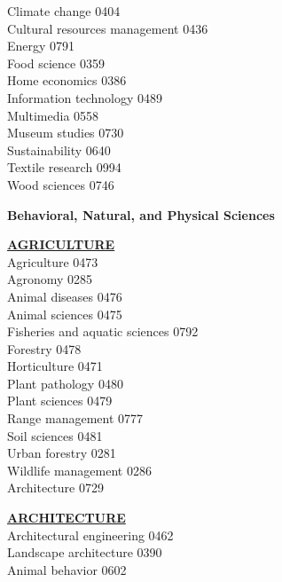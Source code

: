\documentclass[9pt,twoside]{article}
\newcommand{\categoryheading}[1]{{\fontsize{8}{11}\selectfont \textbf{\uline{#1}}}}
\newcommand{\fieldheading}[1]{{\large \textbf{#1}}}
\begin{document}
{\begin{multicols}{3}
Climate change \hfill 0404 \\
Cultural resources management \hfill 0436 \\
Energy \hfill 0791 \\
Food science \hfill 0359 \\
Home economics \hfill 0386 \\
Information technology \hfill 0489 \\
Multimedia \hfill 0558 \\
Museum studies \hfill 0730 \\
Sustainability \hfill 0640 \\
Textile research \hfill 0994 \\
Wood sciences \hfill 0746 \\
\end{multicols}
\clearpage
\fieldheading{Behavioral, Natural, and Physical Sciences}
\begin{multicols}{3}
\categoryheading{AGRICULTURE} \\
Agriculture \hfill 0473 \\
Agronomy \hfill 0285 \\
Animal diseases \hfill 0476 \\
Animal sciences \hfill 0475 \\
Fisheries and aquatic sciences \hfill 0792 \\
Forestry \hfill 0478 \\
Horticulture \hfill 0471 \\
Plant pathology \hfill 0480 \\
Plant sciences \hfill 0479 \\
Range management \hfill 0777 \\
Soil sciences \hfill 0481 \\
Urban forestry \hfill 0281 \\
Wildlife management \hfill 0286 \\
Architecture \hfill 0729

\categoryheading{ARCHITECTURE} \\
Architectural engineering \hfill 0462 \\
Landscape architecture \hfill 0390 \\
Animal behavior \hfill 0602


\end{multicols}}
\end{document}
